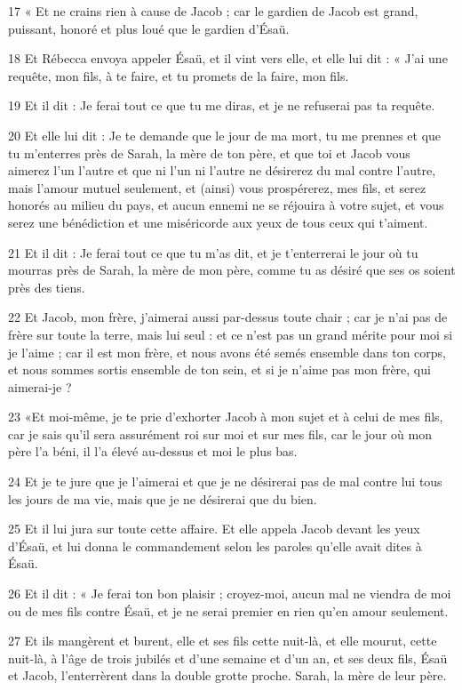 \par 17 « Et ne crains rien à cause de Jacob ; car le gardien de Jacob est grand, puissant, honoré et plus loué que le gardien d'Ésaü.
\par 18 Et Rébecca envoya appeler Ésaü, et il vint vers elle, et elle lui dit : « J'ai une requête, mon fils, à te faire, et tu promets de la faire, mon fils.
\par 19 Et il dit : Je ferai tout ce que tu me diras, et je ne refuserai pas ta requête.
\par 20 Et elle lui dit : Je te demande que le jour de ma mort, tu me prennes et que tu m'enterres près de Sarah, la mère de ton père, et que toi et Jacob vous aimerez l'un l'autre et que ni l'un ni l'autre ne désirerez du mal contre l'autre, mais l'amour mutuel seulement, et (ainsi) vous prospérerez, mes fils, et serez honorés au milieu du pays, et aucun ennemi ne se réjouira à votre sujet, et vous serez une bénédiction et une miséricorde aux yeux de tous ceux qui t'aiment.
\par 21 Et il dit : Je ferai tout ce que tu m'as dit, et je t'enterrerai le jour où tu mourras près de Sarah, la mère de mon père, comme tu as désiré que ses os soient près des tiens.
\par 22 Et Jacob, mon frère, j'aimerai aussi par-dessus toute chair ; car je n'ai pas de frère sur toute la terre, mais lui seul : et ce n'est pas un grand mérite pour moi si je l'aime ; car il est mon frère, et nous avons été semés ensemble dans ton corps, et nous sommes sortis ensemble de ton sein, et si je n'aime pas mon frère, qui aimerai-je ?
\par 23 «Et moi-même, je te prie d'exhorter Jacob à mon sujet et à celui de mes fils, car je sais qu'il sera assurément roi sur moi et sur mes fils, car le jour où mon père l'a béni, il l'a élevé au-dessus et moi le plus bas.
\par 24 Et je te jure que je l'aimerai et que je ne désirerai pas de mal contre lui tous les jours de ma vie, mais que je ne désirerai que du bien.
\par 25 Et il lui jura sur toute cette affaire. Et elle appela Jacob devant les yeux d'Ésaü, et lui donna le commandement selon les paroles qu'elle avait dites à Ésaü.
\par 26 Et il dit : « Je ferai ton bon plaisir ; croyez-moi, aucun mal ne viendra de moi ou de mes fils contre Ésaü, et je ne serai premier en rien qu'en amour seulement.
\par 27 Et ils mangèrent et burent, elle et ses fils cette nuit-là, et elle mourut, cette nuit-là, à l'âge de trois jubilés et d'une semaine et d'un an, et ses deux fils, Ésaü et Jacob, l'enterrèrent dans la double grotte proche. Sarah, la mère de leur père.

